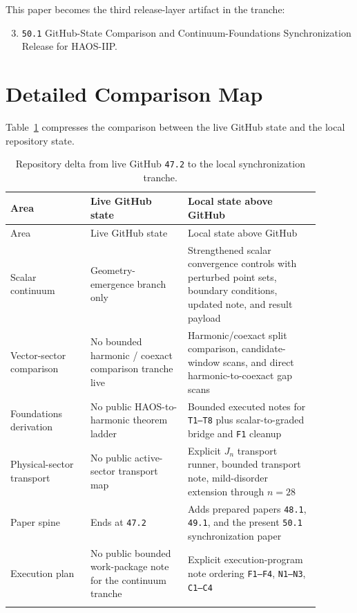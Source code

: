 \documentclass[11pt]{article}
\begin{document}
This paper becomes the third release-layer artifact in the tranche:
\begin{enumerate}
\setcounter{enumi}{2}
\item \texttt{50.1} GitHub-State Comparison and Continuum-Foundations Synchronization Release for HAOS-IIP.
\end{enumerate}

\section{Detailed Comparison Map}

Table~\ref{tab:delta} compresses the comparison between the live GitHub state and the local repository state.

\begin{longtable}{p{0.23\linewidth}p{0.28\linewidth}p{0.38\linewidth}}
\caption{Repository delta from live GitHub \texttt{47.2} to the local synchronization tranche.}\\
\toprule
Area & Live GitHub state & Local state above GitHub \\
\midrule
\endfirsthead
\toprule
Area & Live GitHub state & Local state above GitHub \\
\midrule
\endhead
Scalar continuum & Geometry-emergence branch only & Strengthened scalar convergence controls with perturbed point sets, boundary conditions, updated note, and result payload \\
Vector-sector comparison & No bounded harmonic / coexact comparison tranche live & Harmonic/coexact split comparison, candidate-window scans, and direct harmonic-to-coexact gap scans \\
Foundations derivation & No public HAOS-to-harmonic theorem ladder & Bounded executed notes for \texttt{T1--T8} plus scalar-to-graded bridge and \texttt{F1} cleanup \\
Physical-sector transport & No public active-sector transport map & Explicit \(J_n\) transport runner, bounded transport note, mild-disorder extension through \(n=28\) \\
Paper spine & Ends at \texttt{47.2} & Adds prepared papers \texttt{48.1}, \texttt{49.1}, and the present \texttt{50.1} synchronization paper \\
Execution plan & No public bounded work-package note for the continuum tranche & Explicit execution-program note ordering \texttt{F1--F4}, \texttt{N1--N3}, \texttt{C1--C4} \\
\bottomrule
\label{tab:delta}
\end{longtable}
\end{document}
